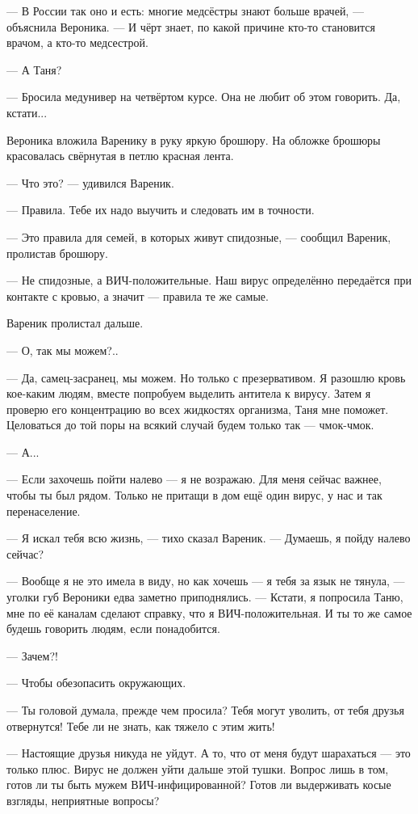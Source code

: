 --- В России так оно и есть: многие медсёстры знают больше врачей, --- объяснила Вероника.
--- И чёрт знает, по какой причине кто-то становится врачом, а кто-то медсестрой.

--- А Таня?

--- Бросила медунивер на четвёртом курсе.
Она не любит об этом говорить.
Да, кстати...

Вероника вложила Варенику в руку яркую брошюру.
На обложке брошюры красовалась свёрнутая в петлю красная лента.

--- Что это? --- удивился Вареник.

--- Правила.
Тебе их надо выучить и следовать им в точности.

--- Это правила для семей, в которых живут спидозные, --- сообщил Вареник, пролистав брошюру.

--- Не спидозные, а ВИЧ-положительные.
Наш вирус определённо передаётся при контакте с кровью, а значит --- правила те же самые.

Вареник пролистал дальше.

--- О, так мы можем?..

--- Да, самец-засранец, мы можем.
Но только с презервативом.
Я разошлю кровь кое-каким людям, вместе попробуем выделить антитела к вирусу.
Затем я проверю его концентрацию во всех жидкостях организма, Таня мне поможет.
Целоваться до той поры на всякий случай будем только так --- чмок-чмок.

--- А...

--- Если захочешь пойти налево --- я не возражаю.
Для меня сейчас важнее, чтобы ты был рядом.
Только не притащи в дом ещё один вирус, у нас и так перенаселение.

--- Я искал тебя всю жизнь, --- тихо сказал Вареник.
--- Думаешь, я пойду налево сейчас?

--- Вообще я не это имела в виду, но как хочешь --- я тебя за язык не тянула, --- уголки губ Вероники едва заметно приподнялись.
--- Кстати, я попросила Таню, мне по её каналам сделают справку, что я ВИЧ-положительная.
И ты то же самое будешь говорить людям, если понадобится.

--- Зачем?!

--- Чтобы обезопасить окружающих.

--- Ты головой думала, прежде чем просила?
Тебя могут уволить, от тебя друзья отвернутся!
Тебе ли не знать, как тяжело с этим жить!

--- Настоящие друзья никуда не уйдут.
А то, что от меня будут шарахаться --- это только плюс.
Вирус не должен уйти дальше этой тушки.
Вопрос лишь в том, готов ли ты быть мужем ВИЧ-инфицированной?
Готов ли выдерживать косые взгляды, неприятные вопросы?

